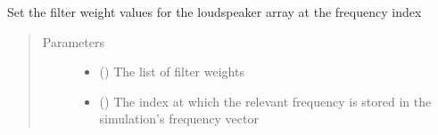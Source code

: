 \documentclass[letterpaper,10pt,english]{sphinxmanual}
\begin{document}
\begin{fulllineitems}
\begin{fulllineitems}
\begin{quote}
\begin{description}
\end{description}\end{quote}

\end{fulllineitems}


\begin{fulllineitems}
\label{\detokenize{source/pyzones:pyzones.LoudspeakerArray.set_q}}
Set the filter weight values for the loudspeaker array at the frequency index
\begin{quote}\begin{description}
\item[{Parameters}] \leavevmode\begin{itemize}
\item {} 
 () \textendash{} The list of filter weights

\item {} 
 () \textendash{} The index at which the relevant frequency is stored in the simulation’s frequency vector

\end{itemize}

\end{description}\end{quote}

\end{fulllineitems}


\end{fulllineitems}

\end{document}
